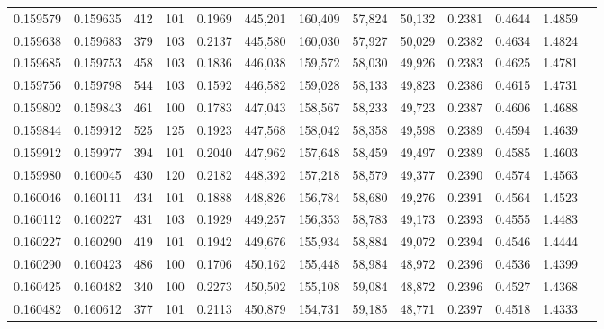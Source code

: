 \begin{tabular}{rrrrrrrrrrrrr}
0.159579 & 0.159635 &   412 & 101 &                                     0.1969 & 445,201 & 160,409 &  57,824 &  50,132 & 0.2381 & 0.4644 & 1.4859 \\
0.159638 & 0.159683 &   379 & 103 &                                     0.2137 & 445,580 & 160,030 &  57,927 &  50,029 & 0.2382 & 0.4634 & 1.4824 \\
0.159685 & 0.159753 &   458 & 103 &                                     0.1836 & 446,038 & 159,572 &  58,030 &  49,926 & 0.2383 & 0.4625 & 1.4781 \\
0.159756 & 0.159798 &   544 & 103 &                                     0.1592 & 446,582 & 159,028 &  58,133 &  49,823 & 0.2386 & 0.4615 & 1.4731 \\
0.159802 & 0.159843 &   461 & 100 &                                     0.1783 & 447,043 & 158,567 &  58,233 &  49,723 & 0.2387 & 0.4606 & 1.4688 \\
0.159844 & 0.159912 &   525 & 125 &                                     0.1923 & 447,568 & 158,042 &  58,358 &  49,598 & 0.2389 & 0.4594 & 1.4639 \\
0.159912 & 0.159977 &   394 & 101 &                                     0.2040 & 447,962 & 157,648 &  58,459 &  49,497 & 0.2389 & 0.4585 & 1.4603 \\
0.159980 & 0.160045 &   430 & 120 &                                     0.2182 & 448,392 & 157,218 &  58,579 &  49,377 & 0.2390 & 0.4574 & 1.4563 \\
0.160046 & 0.160111 &   434 & 101 &                                     0.1888 & 448,826 & 156,784 &  58,680 &  49,276 & 0.2391 & 0.4564 & 1.4523 \\
0.160112 & 0.160227 &   431 & 103 &                                     0.1929 & 449,257 & 156,353 &  58,783 &  49,173 & 0.2393 & 0.4555 & 1.4483 \\
0.160227 & 0.160290 &   419 & 101 &                                     0.1942 & 449,676 & 155,934 &  58,884 &  49,072 & 0.2394 & 0.4546 & 1.4444 \\
0.160290 & 0.160423 &   486 & 100 &                                     0.1706 & 450,162 & 155,448 &  58,984 &  48,972 & 0.2396 & 0.4536 & 1.4399 \\
0.160425 & 0.160482 &   340 & 100 &                                     0.2273 & 450,502 & 155,108 &  59,084 &  48,872 & 0.2396 & 0.4527 & 1.4368 \\
0.160482 & 0.160612 &   377 & 101 &                                     0.2113 & 450,879 & 154,731 &  59,185 &  48,771 & 0.2397 & 0.4518 & 1.4333 \\

\end{tabular}
